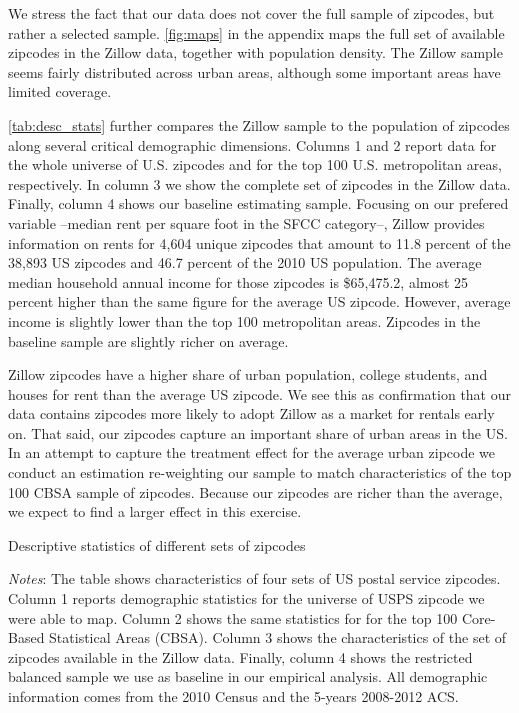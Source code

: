 We stress the fact that our data does not cover the full sample of zipcodes, but rather a 
selected sample. \autoref{fig:maps} in the appendix maps the full set of available 
zipcodes in the Zillow data, together with population density. The Zillow sample seems 
fairly distributed across urban areas, although some important areas have limited coverage. 

\autoref{tab:desc_stats} further compares the Zillow sample to the population of zipcodes 
along several critical demographic dimensions. Columns 1 and 2 report data for the whole 
universe of U.S. zipcodes and for the top 100 U.S. metropolitan areas, respectively. In column 
3 we show the complete set of zipcodes in the Zillow data. Finally, column 4 shows our 
baseline estimating sample. Focusing on our prefered variable --median rent per square 
foot in the SFCC category--, Zillow provides information on rents for 4,604 unique zipcodes 
that amount to 11.8 percent of the 38,893 US zipcodes and 46.7 percent of the 2010 US 
population. The average median household annual income for those zipcodes is \$65,475.2, 
almost 25 percent higher than the same figure for the average US zipcode. However, average 
income is slightly lower than the top 100 metropolitan areas. Zipcodes in the baseline 
sample are slightly richer on average. 

Zillow zipcodes have a higher share of urban population, college students, and houses for 
rent than the average US zipcode. We see this as confirmation that our data 
contains zipcodes more likely to adopt Zillow as a market for rentals early on. That said, 
our zipcodes capture an important share of urban areas in the US. In an attempt to capture 
the treatment effect for the average urban zipcode we conduct an estimation re-weighting 
our sample to match characteristics of the top 100 CBSA sample of zipcodes. Because our 
zipcodes are richer than the average, we expect to find a larger effect in this exercise.

\begin{table}[h!]
	\caption{Descriptive statistics of different sets of zipcodes}
	\centering
	\label{tab:desc_stats}    
	
	\begin{minipage}{0.95\textwidth} \footnotesize
		\vspace{3mm} 
		\textit{Notes}: The table shows characteristics of four sets of US postal service 
		zipcodes. Column 1 reports demographic statistics for the universe of USPS zipcode we 
		were able to map. Column 2 shows the same statistics for for the top 100 Core-Based 
		Statistical Areas (CBSA). Column 3 shows the characteristics of the set of zipcodes 
		available in the Zillow data. Finally, column 4 shows the restricted balanced sample 
		we use as baseline in our empirical analysis. All demographic information comes from 
		the 2010 Census and the 5-years 2008-2012 ACS.
	\end{minipage}
\end{table}

